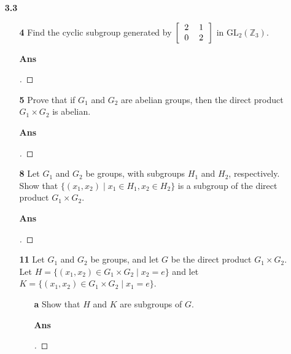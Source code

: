\documentclass[paper=usletter, fontsize=12pt]{article}
\begin{document}
\begin{itemize}
\begin{itemize}
        \end{itemize}

        \item[\textbf{3.3}]

        \begin{itemize}

            \item[\textbf{4}] Find the cyclic subgroup generated by $\left[\begin{tabular}{cc}
                2 & 1 \\
                0 & 2
            \end{tabular}\right]$ in $\text{GL}_2(\mathbb{Z}_3)$.
            \item[\textbf{Ans}]
            \begin{proof}[\unskip\nopunct]
            \end{proof}
            \vspace{0.2in}

            \item[\textbf{5}] Prove that if $G_1$ and $G_2$ are abelian groups,
            then the direct product $G_1 \times G_2$ is abelian.
            \item[\textbf{Ans}]
            \begin{proof}[\unskip\nopunct]
            \end{proof}
            \vspace{0.2in}

            \item[\textbf{8}] Let $G_1$ and $G_2$ be groups, with subgroups
            $H_1$ and $H_2$, respectively. Show that $\{(x_1,x_2) \mid x_1 \in
            H_1, x_2 \in H_2\}$ is a subgroup of the direct product $G_1 \times
            G_2$.
            \item[\textbf{Ans}]
            \begin{proof}[\unskip\nopunct]
            \end{proof}
            \vspace{0.2in}

            \item[\textbf{11}] Let $G_1$ and $G_2$ be groups, and let $G$ be
            the direct product $G_1 \times G_2$. Let $H=\{(x_1,x_2)\in G_1
            \times G_2 \mid x_2 = e\}$ and let $K=\{(x_1,x_2)\in G_1 \times G_2
            \mid x_1 = e\}$.

            \begin{enumerate}

                \item[\textbf{a}] Show that $H$ and $K$ are subgroups of $G$.
                \item[\textbf{Ans}]
                \begin{proof}[\unskip\nopunct]
                \end{proof}
                \vspace{0.2in}


\end{enumerate}
\end{itemize}
\end{itemize}
\end{document}
